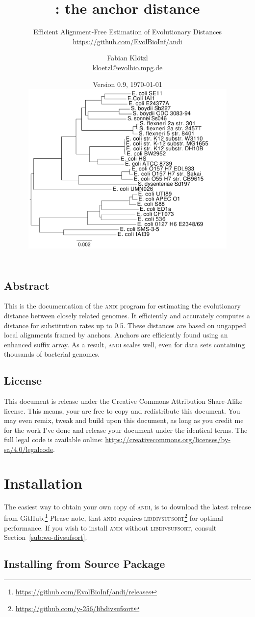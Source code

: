 \documentclass[a4paper,
  10pt,
  english,
  DIV=12,
  BCOR=8mm]{scrbook}
\title{\algo{andi}: the anchor distance}
\subtitle{Efficient Alignment-Free Estimation of Evolutionary Distances\\ {\small\url{https://github.com/EvolBioInf/andi}}}
\author{Fabian Klötzl\\ \href{mailto:kloetzl@evolbio.mpg.de}{kloetzl@evolbio.mpg.de}}
\date{Version 0.9, \isodate\today \\
\vspace*{2cm}
\centering\includegraphics[width=0.8\textwidth]{img/eco29/andi_labels.pdf}}
\newcommand{\algo}[1]{\textsc{{#1}}}
\newcommand{\andi}{\algo{andi} }
\begin{document}
\maketitle

\section*{Abstract}
  This is the documentation of the \andi program for estimating the evolutionary distance between closely related genomes. It efficiently and accurately computes a distance for substitution rates up to 0.5. These distances are based on ungapped local alignments framed by anchors. Anchors are efficiently found using an enhanced suffix array. As a result, \andi scales well, even for data sets containing thousands of bacterial genomes.

\vspace*{1cm}
\section*{License}
This document is release under the Creative Commons Attribution Share-Alike license. This means, your are free to copy and redistribute this document. You may even remix, tweak and build upon this document, as long as you credit me for the work I've done and release your document under the identical terms. The full legal code is available online: {\small\url{https://creativecommons.org/licenses/by-sa/4.0/legalcode}}.

\tableofcontents

\chapter{Installation} %

The easiest way to obtain your own copy of \algo{andi}, is to download the latest release from GitHub.\footnote{\url{https://github.com/EvolBioInf/andi/releases}} Please note, that \andi requires \algo{libdivsufsort}\footnote{\url{https://github.com/y-256/libdivsufsort}} for optimal performance. If you wish to install \andi without \algo{libdivsufsort}, consult Section~\ref{sub:wo-divsufsort}.

\section{Installing from Source Package} \label{sub:regular}
\end{document}
